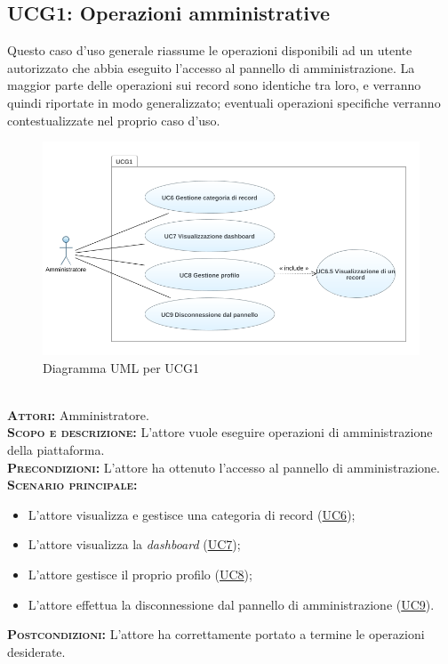 \subsection{UCG1: Operazioni amministrative}
\label{sec:ucg1}  
Questo caso d'uso generale riassume le operazioni disponibili ad un utente autorizzato che abbia eseguito l'accesso al pannello di amministrazione. La maggior parte delle operazioni sui record sono identiche tra loro, e verranno quindi riportate in modo generalizzato; eventuali operazioni specifiche verranno contestualizzate nel proprio caso d'uso.
\begin{figure}[h!]
    \centering
    \includegraphics[width=.8\textwidth]{figures/uc/ucg1.png}
    \caption[Diagramma UML per UCG1]{Diagramma UML per UCG1
    \label{fig:ucg1}}
\end{figure}\\
\textsc{\textbf{Attori:}} Amministratore.\\
\textsc{\textbf{Scopo e descrizione:}} L'attore vuole eseguire operazioni di amministrazione della piattaforma.\\
\textsc{\textsc{\textbf{Precondizioni:}}} L'attore ha ottenuto l'accesso al pannello di amministrazione.\\
\textsc{\textbf{Scenario principale:}} 
\begin{itemize}
    \item L'attore visualizza e gestisce una categoria di record (\hyperref[sec:UC6]{UC6});
    \item L'attore visualizza la \textit{dashboard} (\hyperref[sec:UC7]{UC7});
    \item L'attore gestisce il proprio profilo (\hyperref[sec:UC8]{UC8});
    \item L'attore effettua la disconnessione dal pannello di amministrazione (\hyperref[sec:UC9]{UC9}).
\end{itemize}
\textsc{\textbf{Postcondizioni:}} L'attore ha correttamente portato a termine le operazioni desiderate.

